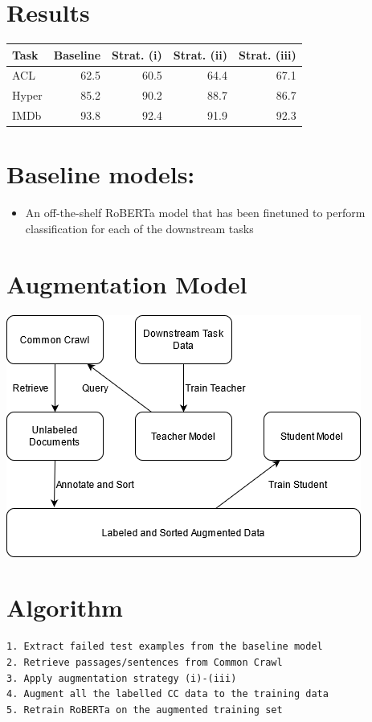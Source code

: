 \documentclass[twocolumn]{article}
\begin{document}
\section{Results}
\label{sec:org14ae7f1}
\begin{center}
\begin{tabular}{lrrrr}
\hline
Task & Baseline & Strat. (i) & Strat. (ii) & Strat. (iii)\\
\hline
ACL & 62.5 & 60.5 & 64.4 & 67.1\\
\hline
Hyper & 85.2 & 90.2 & 88.7 & 86.7\\
\hline
IMDb & 93.8 & 92.4 & 91.9 & 92.3\\
\hline
\end{tabular}
\end{center}

\section{Baseline models:}
\label{sec:org103a0d1}
\begin{itemize}
\item An off-the-shelf RoBERTa model that has been finetuned to perform classification for each of the downstream tasks
\end{itemize}

\section{Augmentation Model}
\label{sec:org919a13a}
\begin{center}
\includegraphics[width=.9\linewidth]{./png/da.png}
\end{center}

\section{Algorithm}
\label{sec:orgde2d53c}
\begin{verbatim}
1. Extract failed test examples from the baseline model
2. Retrieve passages/sentences from Common Crawl 
3. Apply augmentation strategy (i)-(iii)
4. Augment all the labelled CC data to the training data
5. Retrain RoBERTa on the augmented training set 
\end{verbatim}
\end{document}
